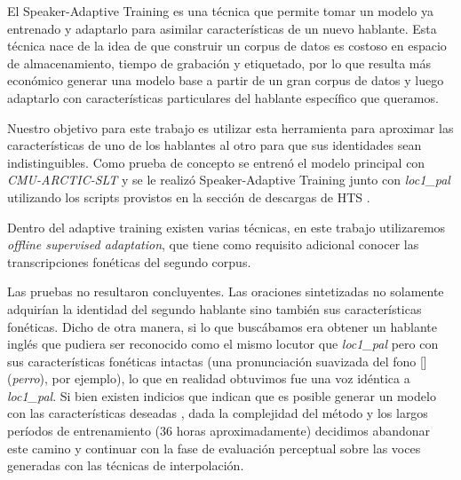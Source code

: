 El Speaker-Adaptive Training es una técnica que permite tomar un modelo ya entrenado y adaptarlo para asimilar características de un nuevo hablante. Esta técnica nace de la idea de que construir un corpus de datos es costoso en espacio de almacenamiento, tiempo de grabación y etiquetado, por lo que resulta más económico generar una modelo base a partir de un gran corpus de datos y luego adaptarlo con características particulares del hablante específico que queramos.

Nuestro objetivo para este trabajo es utilizar esta herramienta para aproximar las características de uno de los hablantes al otro para que sus identidades sean indistinguibles. Como prueba de concepto se entrenó el modelo principal con \textit{CMU-ARCTIC-SLT} y se le realizó Speaker-Adaptive Training junto con \textit{loc1\_pal} utilizando los scripts provistos en la sección de descargas de HTS \cite{speakerAdaptativeTrainingLink}.

Dentro del adaptive training existen varias técnicas, en este trabajo utilizaremos \textit{offline supervised adaptation}, que tiene como requisito adicional conocer las transcripciones fonéticas del segundo corpus. 

Las pruebas no resultaron concluyentes. Las oraciones sintetizadas no solamente adquirían la identidad del segundo hablante sino también sus características fonéticas. Dicho de otra manera, si lo que buscábamos era obtener un hablante inglés que pudiera ser reconocido como el mismo locutor que \textit{loc1\_pal} pero con sus características fonéticas intactas (una pronunciación suavizada del fono [] (\textit{perro}), por ejemplo), lo que en realidad obtuvimos fue una voz idéntica a \textit{loc1\_pal}. Si bien existen indicios que indican que es posible generar un modelo con las características deseadas \cite{statisticalParam} \cite{speakerSim}, dada la complejidad del método y los largos períodos de entrenamiento ($36$ horas aproximadamente) decidimos abandonar este camino y continuar con la fase de evaluación perceptual sobre las voces generadas con las técnicas de interpolación.